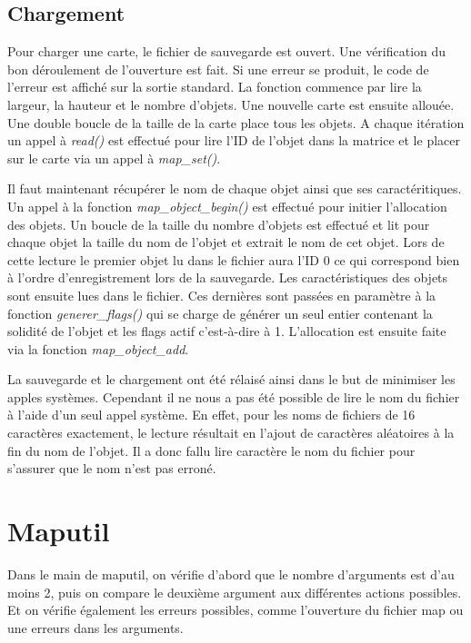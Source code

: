 \documentclass[10pt,a4paper]{article}
\begin{document}
\subsection{Chargement}

	Pour charger une carte, le fichier de sauvegarde est ouvert. Une vérification du bon déroulement de l'ouverture est fait. Si une erreur se produit, le code de l'erreur est affiché sur la sortie standard. La fonction commence par lire la largeur, la hauteur et le nombre d'objets. Une nouvelle carte est ensuite allouée. Une double boucle de la taille de la carte place tous les objets. A chaque itération un appel à \textit{read()} est effectué pour lire l'ID de l'objet dans la matrice et le placer sur le carte via un appel à \textit{map\_set()}.
	
	Il faut maintenant récupérer le nom de chaque objet ainsi que ses caractéritiques. Un appel à la fonction \textit{map\_object\_begin()} est effectué pour initier l'allocation des objets. Un boucle de la taille du nombre d'objets est effectué et lit pour chaque objet la taille du nom de l'objet et extrait le nom de cet objet. Lors de cette lecture le premier objet lu dans le fichier aura l'ID 0 ce qui correspond bien à l'ordre d'enregistrement lors de la sauvegarde. Les caractéristiques des objets sont ensuite lues dans le fichier. Ces dernières sont passées en paramètre à la fonction \textit{generer\_flags()} qui se charge de générer un seul entier contenant la solidité de l'objet et les flags actif c'est-à-dire à 1. L'allocation est ensuite faite via la fonction \textit{map\_object\_add}.
	
	La sauvegarde et le chargement ont été rélaisé ainsi dans le but de minimiser les apples systèmes. Cependant il ne nous a pas été possible de lire le nom du fichier à l'aide d'un seul appel système. En effet, pour les noms de fichiers de 16 caractères exactement, le lecture résultait en l'ajout de caractères aléatoires à la fin du nom de l'objet. Il a donc fallu lire caractère le nom du fichier pour s'assurer que le nom n'est pas erroné. 
	

\section{Maputil}
    Dans le main de maputil, on vérifie d'abord que le nombre d'arguments est d'au moins 2, puis on compare le deuxième argument aux différentes actions possibles. Et on vérifie également les erreurs possibles, comme l'ouverture du fichier map ou une erreurs dans les arguments.
\end{document}

